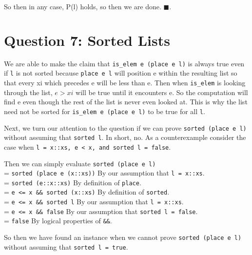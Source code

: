 \documentclass{article}
\begin{document}
\bigskip

\noindent
So then in any case, P(l) holds, so then we are done. $\blacksquare$.




\newpage




\section{Question 7: Sorted Lists}
We are able to make the claim that \texttt{is\_elem e (place e l)} is always true even
if \texttt{l} is not sorted because \texttt{place e l} will position e within the
resulting list so that every xi which precedes e will be less than e. Then when
\texttt{is\_elem} is looking through the list, $e > xi$ will be true until it encounters
e. So the computation will find e even though the rest of the list is never even looked
at. This is why the list need not be sorted for \texttt{is\_elem e (place e l)} to
be true for all \texttt{l}.

\bigskip

\noindent
Next, we turn our attention to the question if we can prove \texttt{sorted (place e l)}
without assuming that \texttt{sorted l}. In short, no. As a counterexample consider the
case when \texttt{l = x::xs, e < x, and sorted l = false}.

\noindent
Then we can simply evaluate \texttt{sorted (place e l)} \\
\indent = \texttt{sorted (place e (x::xs))} \qquad By our assumption that \texttt{l = x::xs}. \\
\indent = \texttt{sorted (e::x::xs)} \qquad By definition of \texttt{place}. \\
\indent = \texttt{e <= x \&\& sorted (x::xs)} \qquad By definition of \texttt{sorted}. \\
\indent = \texttt{e <= x \&\& sorted l} \qquad By our assumption that \texttt{l = x::xs}. \\
\indent = \texttt{e <= x \&\& false} \qquad By our assumption that \texttt{sorted l = false}. \\
\indent = \texttt{false} \qquad By logical properties of \texttt{\&\&}.

So then we have found an instance when we cannot prove \texttt{sorted (place e l)}
without assuming that \texttt{sorted l = true}.
\end{document}
